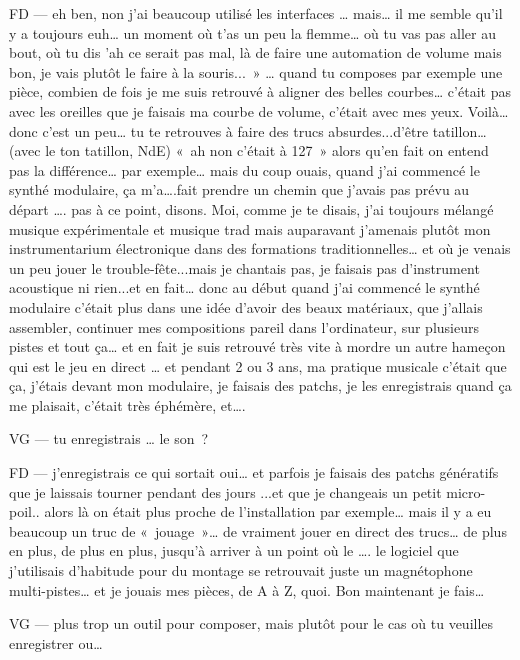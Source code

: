 FD —  eh ben, non j'ai beaucoup utilisé les interfaces … mais… il me semble qu'il y a toujours euh… un moment où t'as un peu la flemme… où tu vas pas aller au bout, où tu dis 'ah ce serait pas mal, là de faire une automation de volume mais bon, je vais plutôt le faire à la souris... » … quand tu composes par exemple une pièce, combien de fois je me suis retrouvé à aligner des belles courbes… c'était pas avec les oreilles que je faisais ma courbe de volume, c'était avec mes yeux. Voilà… donc c'est un peu… tu te retrouves à faire des trucs absurdes...d'être tatillon… (avec le ton tatillon, NdE) « ah non c'était à 127 » alors qu'en fait on entend pas la différence… par exemple… mais du coup ouais, quand j'ai commencé le synthé modulaire, ça m'a….fait prendre un chemin que j'avais pas prévu au départ …. pas à ce point, disons. Moi, comme je te disais, j'ai toujours mélangé musique expérimentale et musique trad mais auparavant j'amenais plutôt mon instrumentarium électronique dans des formations traditionnelles… et où je venais un peu jouer le trouble-fête...mais je chantais pas, je faisais pas d'instrument acoustique ni rien...et en fait… donc au début quand j'ai commencé le synthé modulaire c'était plus dans une idée d'avoir des beaux matériaux, que j'allais assembler, continuer mes compositions pareil dans l'ordinateur, sur plusieurs pistes et tout ça… et en fait je suis retrouvé très vite à mordre un autre hameçon qui est le jeu en direct … et pendant 2 ou 3 ans, ma pratique musicale c'était que ça, j'étais devant mon modulaire, je faisais des patchs, je les enregistrais quand ça me plaisait, c'était très éphémère, et…. 

VG —  tu enregistrais … le son ? 

FD —  j'enregistrais ce qui sortait oui… et parfois je faisais des patchs génératifs que je laissais tourner pendant des jours ...et que je changeais un petit micro-poil.. alors là on était plus proche de l'installation par exemple… mais il y a eu beaucoup un truc de « jouage »… de vraiment jouer en direct des trucs… de plus en plus, de plus en plus, jusqu'à arriver à un point où le …. le logiciel que j'utilisais d'habitude pour du montage se retrouvait juste un magnétophone multi-pistes… et je jouais mes pièces, de A à Z, quoi. Bon maintenant je fais… 

VG —  plus trop un outil pour composer, mais plutôt pour le cas où tu veuilles enregistrer ou… 

